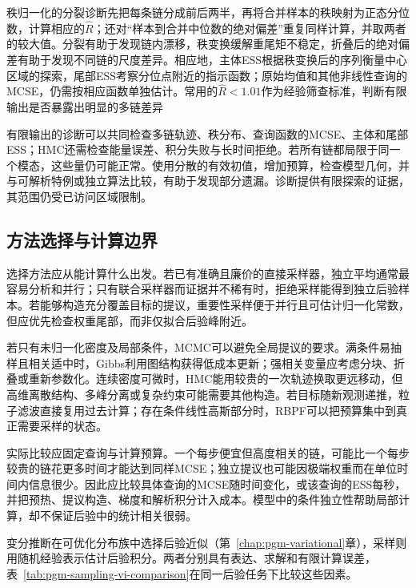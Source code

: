 秩归一化的分裂诊断先把每条链分成前后两半，再将合并样本的秩映射为正态分位数，计算相应的$\widehat R$；还对“样本到合并中位数的绝对偏差”重复同样计算，并取两者的较大值。分裂有助于发现链内漂移，秩变换缓解重尾矩不稳定，折叠后的绝对偏差有助于发现不同链的尺度差异。相应地，主体ESS根据秩变换后的序列衡量中心区域的探索，尾部ESS考察分位点附近的指示函数；原始均值和其他非线性查询的MCSE，仍需按相应函数单独估计。常用的$\widehat R<1.01$作为经验筛查标准，判断有限输出是否暴露出明显的多链差异

有限输出的诊断可以共同检查多链轨迹、秩分布、查询函数的MCSE、主体和尾部ESS；HMC还需检查能量误差、积分失败与长时间拒绝。若所有链都局限于同一个模态，这些量仍可能正常。使用分散的有效初值，增加预算，检查模型几何，并与可解析特例或独立算法比较，有助于发现部分遗漏。诊断提供有限探索的证据，其范围仍受已访问区域限制。

\subsection{方法选择与计算边界}
\label{sec:pgm-sampling-choice}

选择方法应从能计算什么出发。若已有准确且廉价的直接采样器，独立平均通常最容易分析和并行；只有联合采样器而证据并不稀有时，拒绝采样能得到独立后验样本。若能够构造充分覆盖目标的提议，重要性采样便于并行且可估计归一化常数，但应优先检查权重尾部，而非仅拟合后验峰附近。

若只有未归一化密度及局部条件，MCMC可以避免全局提议的要求。满条件易抽样且相关适中时，Gibbs利用图结构获得低成本更新；强相关变量应考虑分块、折叠或重新参数化。连续密度可微时，HMC能用较贵的一次轨迹换取更远移动，但高维离散结构、多峰分离或复杂约束可能需要其他构造。若目标随新观测递推，粒子滤波直接复用过去计算；存在条件线性高斯部分时，RBPF可以把预算集中到真正需要采样的状态。

实际比较应固定查询与计算预算。一个每步便宜但高度相关的链，可能比一个每步较贵的链花更多时间才能达到同样MCSE；独立提议也可能因极端权重而在单位时间内信息很少。因此应比较具体查询的MCSE随时间变化，或该查询的ESS每秒，并把预热、提议构造、梯度和解析积分计入成本。模型中的条件独立性帮助局部计算，却不保证后验中的统计相关很弱。

变分推断在可优化分布族中选择后验近似（第~\ref{chap:pgm-variational}章），采样则用随机经验表示估计后验积分。两者分别具有表达、求解和有限计算误差，表~\ref{tab:pgm-sampling-vi-comparison}在同一后验任务下比较这些因素。

